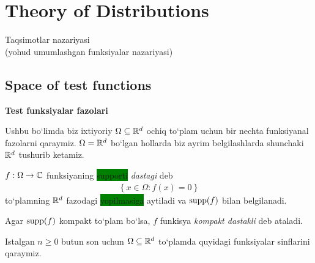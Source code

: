 \section{Theory of Distributions}

\begin{center}
    \Large Taqsimotlar nazariyasi \\
    (yohud umumlashgan funksiyalar nazariyasi)
\end{center}

\subsection{Space of test functions}
\textbf{Test funksiyalar fazolari}

Ushbu bo`limda biz ixtiyoriy $\Omega\subseteq {\mathbb{R}^{d}}$ ochiq to`plam uchun bir nechta funksiyanal fazolarni qaraymiz. $\Omega={\mathbb{R}^{d}}$ bo`lgan hollarda biz ayrim belgilashlarda shunchaki ${\mathbb{R}^{d}}$ tushurib ketamiz. 

\begin{definition}
    $f:\Omega \rightarrow \mathbb{C} $ funksiyaning \colorbox{green}{supporti} \emph{dastagi} deb
    \begin{align}
        \left\{x\in \Omega: f(x)=0  \right\}
    \end{align}
    to`plamning ${\mathbb{R}^{d}}$ fazodagi \colorbox{green}{yopilmasiga} aytiladi va $\operatorname{supp}(f)$ bilan belgilanadi. 

    Agar $\operatorname{supp}(f)$ kompakt to`plam bo`lsa, $f$ funkisya \emph{kompakt dastakli} deb ataladi.
\end{definition}

Istalgan $n\ge 0$ butun son uchun $\Omega\subseteq{\mathbb{R}^{d}}$ to`plamda quyidagi funksiyalar sinflarini qaraymiz.

